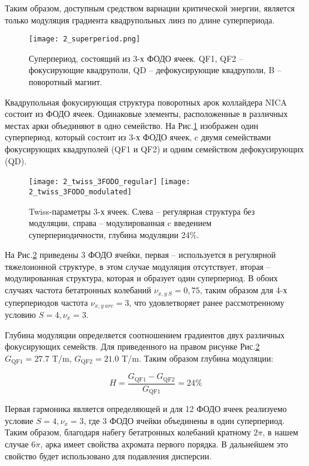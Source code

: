 \noindent Таким образом, доступным средством вариации критической энергии, является только модуляция градиента квадрупольных линз по длине суперпериода.

\begin{figure} [h!]
   \texttt{[image: 2\_superperiod.png]}
   \caption{Суперпериод, состоящий из 3-х ФОДО ячеек. QF1, QF2 – фокусирующие квадруполи, QD –  дефокусирующие квадруполи, B – поворотный магнит.}
   \label{fig:superperiod_3FODO}
\end{figure}

\par Квадрупольная фокусирующая структура поворотных арок коллайдера NICA состоит из ФОДО ячеек. Одинаковые элементы, расположенные в различных местах арки объединяют в одно семейство. На Рис.\ref{fig:superperiod_3FODO} изображен один суперпериод, который состоит из 3-х ФОДО ячеек, c двумя семействами фокусирующих квадруполей (QF1 и QF2) и одним семейством дефокусирующих (QD).

\begin{figure}
   \texttt{[image: 2\_twiss\_3FODO\_regular]}
   \texttt{[image: 2\_twiss\_3FODO\_modulated]}
   \caption{Twiss-параметры 3-х ячеек. Слева – регулярная структура без модуляции, справа – модулированная c введением суперпериодичности, глубина модуляции 24\%.}
   \label{fig:twiss_3FODO}
\end{figure}

На Рис.\ref{fig:twiss_3FODO} приведены 3 ФОДО ячейки, первая – используется в регулярной тяжелоионной структуре, в этом случае модуляция отсутствует, вторая – модулированная структура,  которая и образует один суперпериод. В обоих случаях частота бетатронных колебаний $\nu_{x,y\ S}=0,75$, таким образом для 4-х суперпериодов частота $\nu_{x,y\ arc}=3$, что удовлетворяет ранее рассмотренному условию $S=4, \nu_x=3$.

Глубина модуляции определяется соотношением градиентов двух различных фокусирующих семейств. Для приведенного на правом рисунке Рис.\ref{fig:twiss_3FODO} $G_{\textrm{QF1}}=27.7$ T/m, $G_{\textrm{QF2}}=21.0$ T/m. Таким образом глубина модуляции:

\begin{equation}
H=\frac{G_{\textrm{QF1}}-G_{\textrm{QF2}}}{G_{\textrm{QF1}}}=24\%
\label {eq:gamma_tr_modulated}
\end{equation}

\par Первая гармоника является определяющей и для 12 ФОДО ячеек реализуемо условие $S=4, \nu_x=3$, где 3 ФОДО ячейки объединены в один суперпериод. Таким образом, благодаря набегу бетатронных колебаний кратному $2\pi$, в нашем случае $6\pi$, арка имеет свойства ахромата первого порядка. В дальнейшем это свойство будет использовано для подавления дисперсии.

